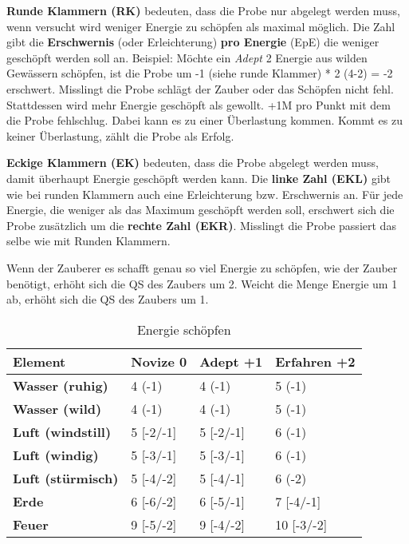 \textbf{Runde Klammern (RK)} bedeuten, dass die Probe nur abgelegt werden muss, wenn versucht wird weniger Energie zu schöpfen als maximal möglich. Die Zahl gibt die \textbf{Erschwernis} (oder Erleichterung) \textbf{pro Energie} (EpE) die weniger geschöpft werden soll an. Beispiel: Möchte ein \textit{Adept} 2 Energie aus wilden Gewässern schöpfen, ist die Probe um -1 (siehe runde Klammer) * 2 (4-2) = -2 erschwert. Misslingt die Probe schlägt der Zauber oder das Schöpfen nicht fehl. Stattdessen wird mehr Energie geschöpft als gewollt. +1M pro Punkt mit dem die Probe fehlschlug. Dabei kann es zu einer Überlastung kommen. Kommt es zu keiner Überlastung, zählt die Probe als Erfolg.

\textbf{Eckige Klammern (EK)} bedeuten, dass die Probe abgelegt werden muss, damit überhaupt Energie geschöpft werden kann. Die \textbf{linke Zahl (EKL)} gibt wie bei runden Klammern auch eine Erleichterung bzw. Erschwernis an. Für jede Energie, die weniger als das Maximum geschöpft werden soll, erschwert sich die Probe zusätzlich um die \textbf{rechte Zahl (EKR)}. Misslingt die Probe passiert das selbe wie mit Runden Klammern.

Wenn der Zauberer es schafft genau so viel Energie zu schöpfen, wie der Zauber benötigt, erhöht sich die QS des Zaubers um 2. Weicht die Menge Energie um 1 ab, erhöht sich die QS des Zaubers um 1.

\begin{table}[H]
\begin{center}
\begin{tabular}{|l|l|l|l|}
\hline
\textbf{Element} & \textbf{Novize 0} & \textbf{Adept +1} & \textbf{Erfahren +2} \\ \hline
\textbf{Wasser (ruhig)} & 4 (-1) & 4 (-1) & 5 (-1) \\ \hline
\textbf{Wasser (wild)} & 4 (-1) & 4 (-1) & 5 (-1) \\ \hline
\textbf{Luft (windstill)} & 5 [-2/-1] & 5 [-2/-1] & 6 (-1) \\ \hline
\textbf{Luft (windig)} & 5 [-3/-1] & 5 [-3/-1] & 6 (-1) \\ \hline
\textbf{Luft (stürmisch)} & 5 [-4/-2] & 5 [-4/-1] & 6 (-2) \\ \hline
\textbf{Erde} & 6 [-6/-2] & 6 [-5/-1] & 7 [-4/-1] \\ \hline
\textbf{Feuer} & 9 [-5/-2] & 9 [-4/-2] & 10 [-3/-2] \\ \hline

\end{tabular}
\end{center}
\caption{Energie schöpfen}
\label{tab:energie_schoepfen}
\end{table}

